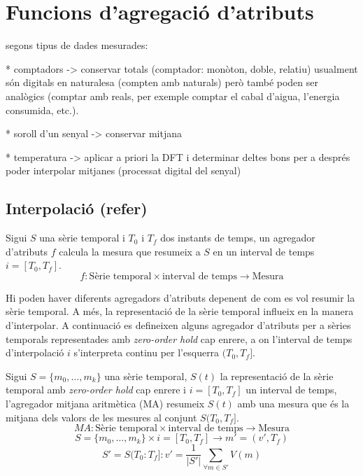 \newcommand{\prev}{\ant}


\section{Funcions d'agregació d'atributs}
\label{sec:model:interpolador}
\label{sec:model:agregador}


segons tipus de dades mesurades:

* comptadors -> conservar totals (comptador: monòton, doble, relatiu)
usualment són digitals en naturalesa (compten amb naturals) però també poden ser analògics (comptar amb reals, per exemple comptar el cabal d'aigua, l'energia consumida, etc.).


* soroll d'un senyal -> conservar mitjana

* temperatura -> aplicar a priori la DFT i determinar deltes bons per a després poder interpolar mitjanes (processat digital del senyal)


\subsection{Interpolació (refer)}

Sigui $S$ una sèrie temporal i $T_0$ i $T_f$ dos instants de temps, un agregador d'atributs $f$ calcula la mesura que resumeix a $S$ en un interval de temps $i=[T_0,T_f]$. 
\[
f: \text{Sèrie temporal} \times \text{interval de temps} \longrightarrow \text{Mesura}
\]

Hi poden haver diferents agregadors d'atributs depenent de com es vol resumir la sèrie temporal. A més, la representació de la sèrie temporal influeix en la manera d'interpolar. A continuació es defineixen alguns agregador d'atributs per a sèries temporals representades amb  \emph{zero-order hold} cap enrere, a on l'interval de temps d'interpolació $i$ s'interpreta continu per l'esquerra $(T_0,T_f]$. 


\begin{definition}
  Sigui $S=\{m_0,\ldots,m_k\}$ una sèrie temporal, $S(t)$ la
  representació de la sèrie temporal amb \emph{zero-order hold} cap
  enrere i $i=[T_0,T_f]$ un interval de temps, l'agregador mitjana
  aritmètica (MA) resumeix $S(t)$ amb una mesura que és la mitjana dels
  valors de les mesures al conjunt $S(T_0,T_f]$.
\[
MA: \text{Sèrie temporal} \times \text{interval de temps}
\longrightarrow \text{Mesura}
\]
\[
S=\{m_0,\ldots,m_k\} \times i=[T_0,T_f] \longrightarrow m'=(v',T_f)
\]
\[
S'=S(T_0:T_f]:
v' = \frac{1}{|S'|} \sum\limits_{\forall m\in S'} V(m)
\]
\end{definition}

